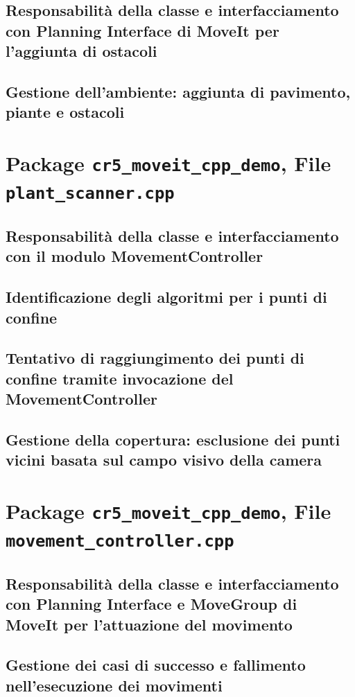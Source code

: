 \documentclass[12pt,a4paper,twoside,openright]{book}
\begin{document}
	\subsection{Responsabilità della classe e interfacciamento con Planning Interface di MoveIt per l'aggiunta di ostacoli}
	\subsection{Gestione dell'ambiente: aggiunta di pavimento, piante e ostacoli}
	
	\section{Package \texttt{cr5\_moveit\_cpp\_demo}, File \texttt{plant\_scanner.cpp}}
	\subsection{Responsabilità della classe e interfacciamento con il modulo MovementController}
	\subsection{Identificazione degli algoritmi per i punti di confine}
	\subsection{Tentativo di raggiungimento dei punti di confine tramite invocazione del MovementController}
	\subsection{Gestione della copertura: esclusione dei punti vicini basata sul campo visivo della camera}
	
	\section{Package \texttt{cr5\_moveit\_cpp\_demo}, File \texttt{movement\_controller.cpp}}
	\subsection{Responsabilità della classe e interfacciamento con Planning Interface e MoveGroup di MoveIt per l'attuazione del movimento}
	\subsection{Gestione dei casi di successo e fallimento nell'esecuzione dei movimenti}
	
\end{document}
